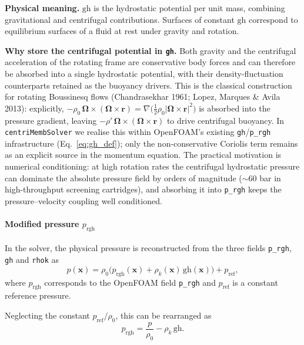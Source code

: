\documentclass[11pt,a4paper]{article}
\begin{document}
\medskip
\noindent
\textbf{Physical meaning.}
\(\mathrm{gh}\) is the hydrostatic potential per unit mass, combining
gravitational and centrifugal contributions. Surfaces of constant
\(\mathrm{gh}\) correspond to equilibrium surfaces of a fluid at rest
under gravity and rotation.

\medskip
\noindent
\textbf{Why store the centrifugal potential in \texttt{gh}.}
Both gravity and the centrifugal acceleration of the rotating frame are
conservative body forces and can therefore be absorbed into a single
hydrostatic potential, with their density-fluctuation counterparts
retained as the buoyancy drivers. This is the classical construction
for rotating Boussinesq flows (Chandrasekhar 1961; Lopez, Marques \&
Avila 2013): explicitly,
\(-\rho_0\,\boldsymbol{\Omega}\times(\boldsymbol{\Omega}\times\mathbf{r})
= \nabla\!\bigl(\tfrac12\rho_0|\boldsymbol{\Omega}\times\mathbf{r}|^2\bigr)\)
is absorbed into the pressure gradient, leaving
\(-\rho'\,\boldsymbol{\Omega}\times(\boldsymbol{\Omega}\times\mathbf{r})\)
to drive centrifugal buoyancy. In \texttt{centriMembSolver} we realise
this within OpenFOAM's existing \texttt{gh}/\texttt{p\_rgh}
infrastructure (Eq.~\eqref{eq:gh_def}); only the non-conservative
Coriolis term remains as an explicit source in the momentum equation.
The practical motivation is numerical conditioning: at high rotation
rates the centrifugal hydrostatic pressure can dominate the absolute
pressure field by orders of magnitude (\(\sim 60\) bar in
high-throughput screening cartridges), and absorbing it into
\texttt{p\_rgh} keeps the pressure–velocity coupling well conditioned.

\paragraph{Modified pressure \(p_{\mathrm{rgh}}\)}

In the solver, the physical pressure is reconstructed from the three
fields \texttt{p\_rgh}, \texttt{gh} and \texttt{rhok} as
\begin{equation}
	p(\boldsymbol{x})
	=
	\rho_0\bigl(
	p_{\mathrm{rgh}}(\boldsymbol{x})
	+ \rho_k(\boldsymbol{x})\,\mathrm{gh}(\boldsymbol{x})
	\bigr)
	+ p_{\mathrm{ref}},
	\label{eq:p_reconstruct}
\end{equation}
where \(p_{\mathrm{rgh}}\) corresponds to the OpenFOAM field
\texttt{p\_rgh} and \(p_{\mathrm{ref}}\) is a constant reference pressure.

Neglecting the constant \(p_{\mathrm{ref}}/\rho_0\), this can be
rearranged as
\begin{equation}
	p_{\mathrm{rgh}}
	=
	\frac{p}{\rho_0}
	- \rho_k\,\mathrm{gh}.
	\label{eq:p_rgh_def}
\end{equation}
\end{document}
